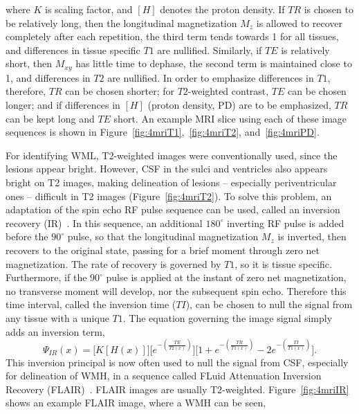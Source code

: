 where $K$ is scaling factor, and $\left[H\right]$ denotes the proton density.
If $TR$ is chosen to be relatively long,
then the longitudinal magnetization $M_z$ is allowed to recover completely after each repetition,
the third term tends towards 1 for all tissues,
and differences in tissue specific $T1$ are nullified.
Similarly, if $TE$ is relatively short,
then $M_{xy}$ has little time to dephase,
the second term is maintained close to 1,
and differences in $T2$ are nullified.
In order to emphasize differences in $T1$, therefore, $TR$ can be chosen shorter;
for $T2$-weighted contrast, $TE$ can be chosen longer;
and if differences in $[H]$ (proton density, PD) are to be emphasized,
$TR$ can be kept long and $TE$ short.
An example MRI slice using each of these image sequences
is shown in Figure~\ref{fig:4mriT1},~\ref{fig:4mriT2}, and~\ref{fig:4mriPD}.
\par
For identifying WML, T2-weighted images were conventionally used, since the lesions appear bright.
However, CSF in the sulci and ventricles also appears bright on T2 images,
making delineation of lesions -- especially periventricular ones --
difficult in T2 images (Figure~\ref{fig:4mriT2}).
To solve this problem, an adaptation of the spin echo RF pulse sequence can be used,
called an inversion recovery (IR)~\cite{Bydder1985}.
In this sequence, an additional $180^{\circ}$ inverting RF pulse is added before the
$90^{\circ}$ pulse, so that the longitudinal magnetization $M_z$ is inverted,
then recovers to the original state, passing for a brief moment through zero net magnetization.
The rate of recovery is governed by $T1$, so it is tissue specific.
Furthermore, if the $90^{\circ}$ pulse is applied at the instant of zero net magnetization,
no transverse moment will develop, nor the subsequent spin echo.
Therefore this time interval, called the inversion time ($TI$),
can be chosen to null the signal from any tissue with a unique $T1$.
The equation governing the image signal simply adds an inversion term,
\begin{equation}\label{eq:MRI-IR}
  \Psi_{IR}(x) = \bigg[K \left[H(x)\right]\bigg]
    \bigg[e^{-\left(\frac{TE}{T2(x)}\right)}\bigg]
    \bigg[1 + e^{-\left(\frac{TR}{T1(x)}\right)} - 2e^{-\left(\frac{TI}{T1(x)}\right)}\bigg].
\end{equation}
This inversion principal is now often used to null the signal from CSF,
especially for delineation of WMH, in a sequence called
FLuid Attenuation Inversion Recovery (FLAIR)~\cite{Hajnal1992}.
FLAIR images are usually T2-weighted.
Figure~\ref{fig:4mriIR} shows an example FLAIR image, where a WMH can be seen,
